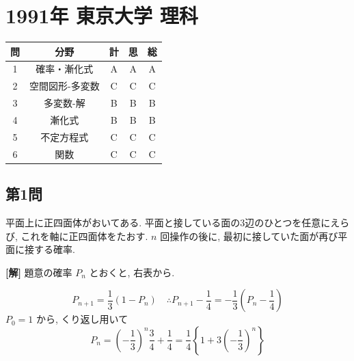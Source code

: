 \documentclass[../main.tex]{subfiles}
\begin{document}
\section*{1991年 東京大学 理科}

\begin{center}
  \begin{tabular}{|c|c|c|c|c|}
    \hline
    問 & 分野 & 計 & 思 & 総 \\ \hline
    1 & 確率・漸化式 & A & A & A \\ \hline
    2 & 空間図形-多変数 & C & C & C \\ \hline
    3 & 多変数-解 & B & B & B \\ \hline
    4 & 漸化式 & B & B & B \\ \hline
    5 & 不定方程式 & C & C & C \\ \hline
    6 & 関数 & C & C & C \\ \hline
  \end{tabular}
\end{center}

\bigskip

\subsection*{第1問}

平面上に正四面体がおいてある. 平面と接している面の3辺のひとつを任意にえらび, これを軸に正四面体をたおす. $n$ 回操作の後に, 最初に接していた面が再び平面に接する確率.

\bigskip

\noindent
\textbf{[解]} 題意の確率 $P_n$ とおくと, 右表から.

\begin{center}
\end{center}

\[
  P_{n+1} = \frac{1}{3}(1 - P_n) \quad \therefore P_{n+1} - \frac{1}{4} = -\frac{1}{3}\left(P_n - \frac{1}{4}\right)
\]
$P_0 = 1$ から, くり返し用いて
\[
  P_n = \left(-\frac{1}{3}\right)^n \frac{3}{4} + \frac{1}{4} = \frac{1}{4} \left\{ 1 + 3\left(-\frac{1}{3}\right)^n \right\}
\]

\newpage
\end{document}

